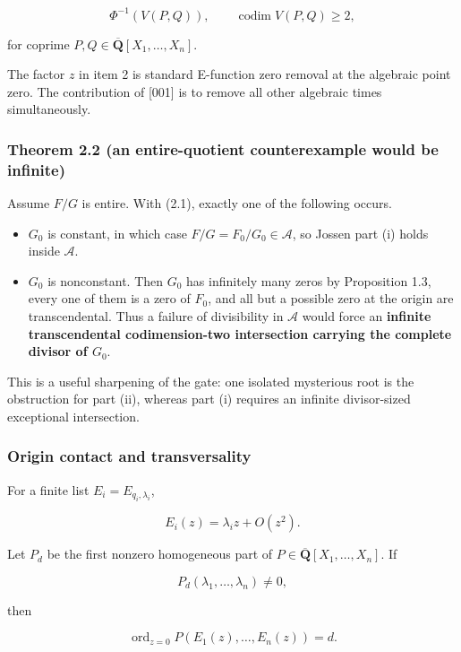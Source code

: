 \[
  \Phi^{-1}(V(P,Q)),\qquad \operatorname{codim}V(P,Q)\ge2,  \tag{J-2.3}
\]

for coprime \(P,Q\in\overline{\mathbf Q}[X_1,\ldots,X_n]\).

The factor \(z\) in item 2 is standard E-function zero removal at the
algebraic point zero.  The contribution of [001] is to remove all other
algebraic times simultaneously.

\subsubsection{Theorem 2.2 (an entire-quotient counterexample would be infinite)}

Assume \(F/G\) is entire. With (2.1), exactly one of the following occurs.

\begin{itemize}
\tightlist
\item
  \(G_0\) is constant, in which case \(F/G=F_0/G_0\in\mathscr A\), so
  Jossen part (i) holds inside \(\mathscr A\).
\item
  \(G_0\) is nonconstant. Then \(G_0\) has infinitely many zeros by
  Proposition 1.3, every one of them is a zero of \(F_0\), and all but a
  possible zero at the origin are transcendental. Thus a failure of
  divisibility in \(\mathscr A\) would force an \textbf{infinite transcendental
  codimension-two intersection carrying the complete divisor of \(G_0\)}.
\end{itemize}

This is a useful sharpening of the gate: one isolated mysterious root is the
obstruction for part (ii), whereas part (i) requires an infinite divisor-sized
exceptional intersection.

\subsubsection{Origin contact and transversality}

For a finite list \(E_i=E_{q_i,\lambda_i}\),

\[
  E_i(z)=\lambda_i z+O(z^2).
\]

Let \(P_d\) be the first nonzero homogeneous part of
\(P\in\overline{\mathbf Q}[X_1,\ldots,X_n]\). If

\[
  P_d(\lambda_1,\ldots,\lambda_n)\ne0,
\]

then

\[
  \operatorname{ord}_{z=0}P(E_1(z),\ldots,E_n(z))=d.          \tag{J-2.4}
\]

